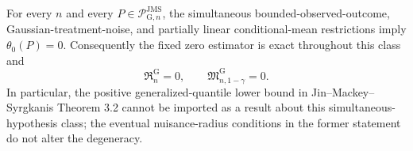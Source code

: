 For every \(n\) and every \(P\in\mathcal P_{\mathrm G,n}^{\mathrm{JMS}}\), the simultaneous bounded-observed-outcome, Gaussian-treatment-noise, and partially linear conditional-mean restrictions imply \(\theta_0(P)=0\). Consequently the fixed zero estimator is exact throughout this class and
\[
 \mathfrak R_n^{\mathrm G}=0,
 \qquad
 \mathfrak M_{n,1-\gamma}^{\mathrm G}=0.
\]
In particular, the positive generalized-quantile lower bound in Jin--Mackey--Syrgkanis Theorem 3.2 cannot be imported as a result about this simultaneous-hypothesis class; the eventual nuisance-radius conditions in the former statement do not alter the degeneracy.